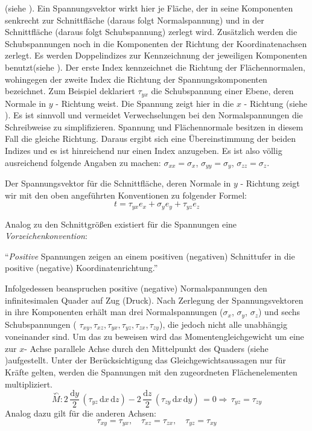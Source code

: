 \documentclass[12pt,a4paper,parskip,twoside,BCOR5mm,headsepline]{scrartcl}
\begin{document}
\begin{description*}
  
  (siehe ). Ein Spannungsvektor wirkt hier je Fläche, der in seine Komponenten senkrecht zur Schnittfläche (daraus folgt Normalspannung) und in der Schnittfläche (daraus folgt Schubspannung) zerlegt wird. Zusätzlich werden die Schubspannungen noch in die Komponenten der Richtung der Koordinatenachsen zerlegt. Es werden Doppelindizes zur Kennzeichnung der jeweiligen Komponenten benutzt(siehe ). 
Der erste Index kennzeichnet die Richtung der Flächennormalen, wohingegen der zweite Index die Richtung der Spannungskomponenten bezeichnet. Zum Beispiel deklariert $ \tau_{yx} $ die Schubspannung einer Ebene, deren Normale in $y$ - Richtung weist. Die Spannung zeigt hier in die $ x $ - Richtung (siehe ). Es ist sinnvoll und vermeidet Verwechselungen bei den Normalspannungen die Schreibweise zu simplifizieren. Spannung und Flächennormale besitzen in diesem Fall die gleiche Richtung. Daraus ergibt sich eine Übereinstimmung der beiden Indizes und es ist hinreichend nur einen Index anzugeben. Es ist also völlig ausreichend  folgende Angaben zu machen: $ \sigma_{xx} = \sigma_{x} $, $ \sigma_{yy} = \sigma_y $, $ \sigma_{zz} = \sigma_z $.

Der Spannungsvektor für die Schnittfläche, deren Normale in $ y $ - Richtung zeigt wir mit den oben angeführten Konventionen zu folgender Formel:
\begin{equation}
t = \tau_{yx}e_x + \sigma_ye_y + \tau_{yz}e_z
\end{equation}

Analog zu den Schnittgrößen existiert für die Spannungen eine \emph{Vorzeichenkonvention}:

"`\emph{Positive} Spannungen zeigen an einem positiven (negativen) Schnittufer in die positive (negative) Koordinatenrichtung."'\autocite[45]{tmr}

Infolgedessen beanspruchen positive (negative) Normalspannungen den infinitesimalen Quader auf Zug (Druck). Nach Zerlegung der Spannungsvektoren in ihre Komponenten erhält man drei Normalspannungen ($ \sigma_x$, $ \sigma_y $, $ \sigma_z $) und sechs Schubspannungen ( $ \tau_{xy}, \tau_{xz}, \tau_{yx}, \tau_{yz}, \tau_{zx}, \tau_{zy} $), die jedoch nicht alle unabhängig voneinander sind. Um das zu beweisen wird das Momentengleichgewicht um eine zur $x$- Achse parallele Achse durch den Mittelpunkt des Quaders (siehe )aufgestellt. Unter der Berücksichtigung das Gleichgewichtsaussagen nur für Kräfte gelten, werden die Spannungen mit den zugeordneten Flächenelementen multipliziert.
\begin{equation}
\overset{\curvearrowleft}{M}: 2\,\frac{\text{d}y}{2}\,(\tau_{yz}\,\text{d}x\,\text{d}z) - 2\,\frac{\text{d}z}{2}\,(\tau_{zy}\, \text{d}x\,\text{d}y)\,= 0 \Rightarrow\,\tau_{yz} = \tau_{zy}
\end{equation} Analog dazu gilt für die anderen Achsen: \begin{equation}
\tau_{xy}=\tau_{yx},\quad\tau_{xz}=\tau_{zx},\quad\tau_{yz}=\tau_{xy}
\end{equation}


\end{description*}
\end{document}
